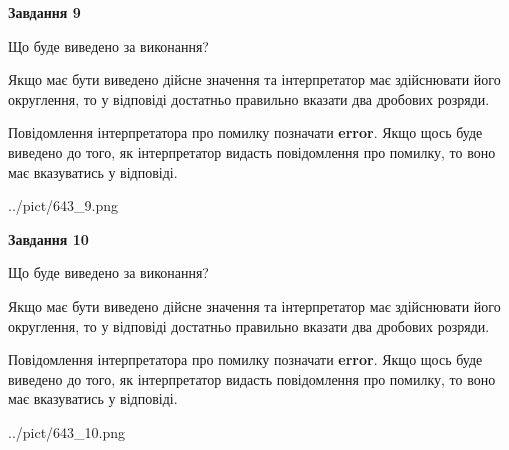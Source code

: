 \documentclass[12pt, ukrainian]{article}
\begin{document}
{\begin {Large}
{\begin {center}\textbf{Завдання 9}\end {center}}\par
Що буде виведено за виконання? \par

Якщо має бути виведено дійсне значення та інтерпретатор має здійснювати його округлення, 
то у відповіді достатньо правильно вказати два дробових розряди.

Повідомлення інтерпретатора про помилку позначати \textbf{error}.
Якщо щось буде виведено до того, як інтерпретатор видасть повідомлення про помилку, 
то воно має вказуватись у відповіді. \par

\begin{center}
	{../pict/643_9.png}
\end{center}
\newpage

{\begin {center}\textbf{Завдання 10}\end {center}}\par
Що буде виведено за виконання? \par

Якщо має бути виведено дійсне значення та інтерпретатор має здійснювати його округлення, 
то у відповіді достатньо правильно вказати два дробових розряди.

Повідомлення інтерпретатора про помилку позначати \textbf{error}.
Якщо щось буде виведено до того, як інтерпретатор видасть повідомлення про помилку, 
то воно має вказуватись у відповіді. \par

\begin{center}
	{../pict/643_10.png}
\end{center}
\newpage

\end {Large}}
\end{document}
